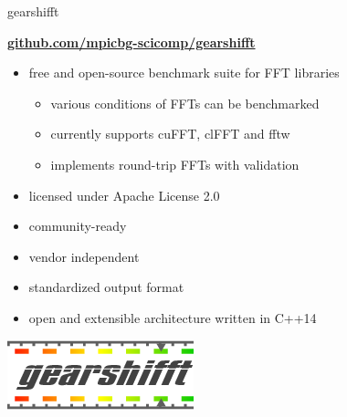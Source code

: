 \documentclass[t,11pt,hyperref={
  pdftitle = {gearshifft},
  pdfsubject = {gearshifft},
  pdfborder={0 0 0},
  colorlinks=true,
  urlcolor=red,
  citecolor=red,
  linkcolor=red,
  pdfauthor={Peter Steinbach, Matthias Werner}
  }
]{beamer}
\begin{document}
\begin{frame}{gearshifft}

\vfill
      \begin{center}\Large
        \href{https://github.com/mpicbg-scicomp/gearshifft}{\textbf{github.com/mpicbg-scicomp/gearshifft}}
      \end{center}

\vfill
  \begin{itemize}
  \item free and open-source benchmark suite for FFT libraries
    \begin{itemize}
    \item various conditions of FFTs can be benchmarked
    \item currently supports cuFFT, clFFT and fftw
    \item implements round-trip FFTs with validation
    \end{itemize}
  \item licensed under Apache License 2.0
  \item community-ready
  \item vendor independent 
  \item standardized output format
  \item open and extensible architecture written in C++14
  \end{itemize}
\vfill
\pause
\begin{center}
  \includegraphics[width=.4\textwidth]{gearshifft_logo_img_100.png}
\end{center}

\vfill
\end{frame}
\end{document}
